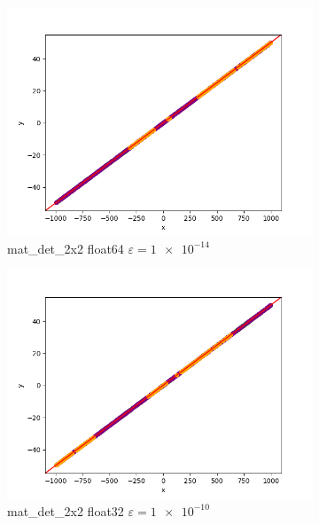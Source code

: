 \documentclass[11pt,a4paper]{article}
\begin{document}
\begin{figure}[H]
\begin{subfigure}[b]{0.46\textwidth}
        \includegraphics[scale=0.4]{res/lin_mat_det_2x2_float64_1e-14.png}
        \caption{\ttfamily\arraybackslash mat\_det\_2x2 float64 $\varepsilon=\num{1e-14}$}
    \end{subfigure}
    \begin{subfigure}[b]{0.46\textwidth}
        \centering
        \includegraphics[scale=0.4]{res/lin_mat_det_2x2_float32_1e-10}
        \caption{\ttfamily\arraybackslash mat\_det\_2x2 float32 $\varepsilon=\num{1e-10}$}
    \end{subfigure}
    \begin{subfigure}[b]{0.46\textwidth}
        \centering

\end{subfigure}
\end{figure}
\end{document}
